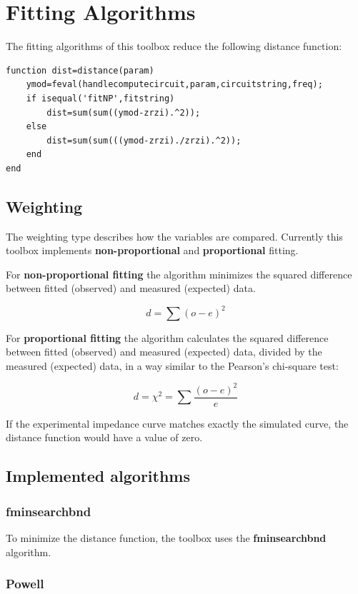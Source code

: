 \documentclass[10pt,a4paper,oneside]{book}
\begin{document}
\chapter{Fitting Algorithms}




The fitting algorithms of this toolbox reduce the following distance function:

\begin{verbatim}
function dist=distance(param)
    ymod=feval(handlecomputecircuit,param,circuitstring,freq);
    if isequal('fitNP',fitstring)
        dist=sum(sum((ymod-zrzi).^2));
    else
        dist=sum(sum(((ymod-zrzi)./zrzi).^2));  
    end
end
\end{verbatim}

\section{Weighting}

The weighting type describes how the variables are compared. Currently this toolbox implements \textbf{non-proportional} and \textbf{proportional} fitting.

For \textbf{non-proportional fitting} the algorithm minimizes the squared difference between fitted (observed) and measured (expected) data.

\[ d = \sum(o-e)^2 \]

For \textbf{proportional fitting} the algorithm calculates the squared difference between fitted (observed) and measured (expected) data, divided by the measured (expected) data, in a way similar to the Pearson's chi-square test:

\[ d = \chi^2 = \sum \dfrac{(o-e)^2}{e} \]

If the experimental impedance curve matches exactly the simulated curve, the distance function would have a value of zero.

\section{Implemented algorithms}

\subsection{fminsearchbnd}

To minimize the distance function, the toolbox uses the \textbf{fminsearchbnd} algorithm.

\subsection{Powell}
\end{document}
